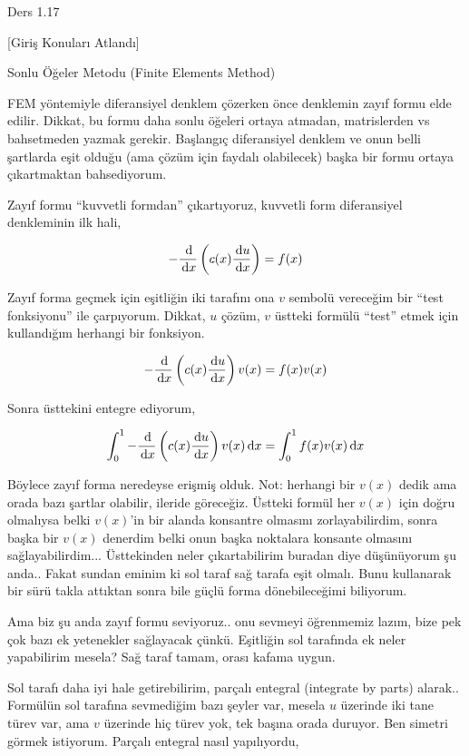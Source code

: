 \documentclass[12pt,fleqn]{article}\usepackage{../../common}
\begin{document}
Ders 1.17

[Giriş Konuları Atlandı]

Sonlu Öğeler Metodu (Finite Elements Method)

FEM yöntemiyle diferansiyel denklem çözerken önce denklemin zayıf formu elde
edilir. Dikkat, bu formu daha sonlu öğeleri ortaya atmadan, matrislerden vs
bahsetmeden yazmak gerekir. Başlangıç diferansiyel denklem ve onun belli
şartlarda eşit olduğu (ama çözüm için faydalı olabilecek) başka bir formu
ortaya çıkartmaktan bahsediyorum. 

Zayıf formu ``kuvvetli formdan'' çıkartıyoruz, kuvvetli form diferansiyel
denkleminin ilk hali,

$$
- \frac{\,\mathrm{d}}{\,\mathrm{d} x} \left( c(x) \frac{\,\mathrm{d} u}{\,\mathrm{d} x} \right) = f(x)
$$

Zayıf forma geçmek için eşitliğin iki tarafını ona $v$ sembolü vereceğim bir
``test fonksiyonu'' ile çarpıyorum. Dikkat, $u$ çözüm, $v$ üstteki formülü
``test'' etmek için kullandığım herhangi bir fonksiyon. 

$$
- \frac{\,\mathrm{d}}{\,\mathrm{d} x} \left( c(x) \frac{\,\mathrm{d} u}{\,\mathrm{d} x} \right) v(x) =
f(x) v(x)
$$

Sonra üsttekini entegre ediyorum,

$$
\int_{0}^{1} - \frac{\,\mathrm{d}}{\,\mathrm{d} x} \left( c(x) \frac{\,\mathrm{d} u}{\,\mathrm{d} x} \right) v(x) \,\mathrm{d} x=
\int_{0}^{1} f(x) v(x) \,\mathrm{d} x
$$

Böylece zayıf forma neredeyse erişmiş olduk. Not: herhangi bir $v(x)$ dedik ama
orada bazı şartlar olabilir, ileride göreceğiz. Üstteki formül her $v(x)$ için
doğru olmalıysa belki $v(x)$'in bir alanda konsantre olmasını zorlayabilirdim,
sonra başka bir $v(x)$ denerdim belki onun başka noktalara konsante olmasını
sağlayabilirdim... Üsttekinden neler çıkartabilirim buradan diye düşünüyorum şu
anda.. Fakat sundan eminim ki sol taraf sağ tarafa eşit olmalı. Bunu kullanarak
bir sürü takla attıktan sonra bile güçlü forma dönebileceğimi biliyorum.

Ama biz şu anda zayıf formu seviyoruz.. onu sevmeyi öğrenmemiz lazım, bize pek
çok bazı ek yetenekler sağlayacak çünkü. Eşitliğin sol tarafında ek neler
yapabilirim mesela? Sağ taraf tamam, orası kafama uygun.

Sol tarafı daha iyi hale getirebilirim, parçalı entegral (integrate by parts)
alarak.. Formülün sol tarafına sevmediğim bazı şeyler var, mesela $u$ üzerinde
iki tane türev var, ama $v$ üzerinde hiç türev yok, tek başına orada duruyor.
Ben simetri görmek istiyorum. Parçalı entegral nasıl yapılıyordu,
\end{document}

